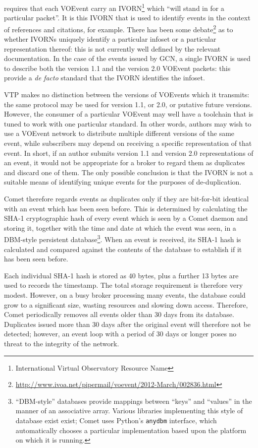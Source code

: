 \documentclass[5p,authoryear]{elsarticle}
\begin{document}
\citet{Seaman:2011} requires that each VOEvent carry an
IVORN\footnote{International Virtual Observatory Resource Name} which ``will
stand in for a particular packet''. It is this IVORN that is used to identify
events in the context of references and citations, for example. There has been
some
debate\footnote{\url{http://www.ivoa.net/pipermail/voevent/2012-March/002836.html}}
as to whether IVORNs uniquely identify a particular infoset or a particular
representation thereof: this is not currently well defined by the relevant
documentation. In the case of the events issued by GCN, a single IVORN is used
to describe both the version 1.1 and the version 2.0 VOEvent packets: this
provide a \textit{de facto} standard that the IVORN identifies the infoset.

VTP makes no distinction between the versions of VOEvents which it transmits:
the same protocol may be used for version 1.1, or 2.0, or putative future
versions. However, the consumer of a particular VOEvent may well have a
toolchain that is tuned to work with one particular standard. In other words,
authors may wish to use a VOEvent network to distribute multiple different
versions of the same event, while subscribers may depend on receiving a
specific representation of that event. In short, if an author submits version
1.1 and version 2.0 representations of an event, it would not be appropriate
for a broker to regard them as duplicates and discard one of them. The only
possible conclusion is that the IVORN is not a suitable means of identifying
unique events for the purposes of de-duplication.

Comet therefore regards events as duplicates only if they are bit-for-bit
identical with an event which has been seen before. This is determined by
calculating the SHA-1 \citep{Eastlake:2001} cryptographic hash of every event
which is seen by a Comet daemon and storing it, together with the time and
date at which the event was seen, in a DBM-style persistent
database\footnote{``DBM-style'' databases provide mappings between ``keys''
and ``values'' in the manner of an associative array. Various libraries
implementing this style of database exist exist; Comet uses Python's
\texttt{anydbm} interface, which automatically chooses a particular
implementation based upon the platform on which it is running.}. When an event
is received, its SHA-1 hash is calculated and compared against the contents of
the database to establish if it has been seen before.

Each individual SHA-1 hash is stored as 40 bytes, plus a further 13 bytes are
used to records the timestamp. The total storage requirement is therefore very
modest. However, on a busy broker processing many events, the database could
grow to a significant size, wasting resources and slowing down access.
Therefore, Comet periodically removes all events older than 30 days from its
database. Duplicates issued more than 30 days after the original event will
therefore not be detected; however, an event loop with a period of 30 days or
longer poses no threat to the integrity of the network.
\end{document}
